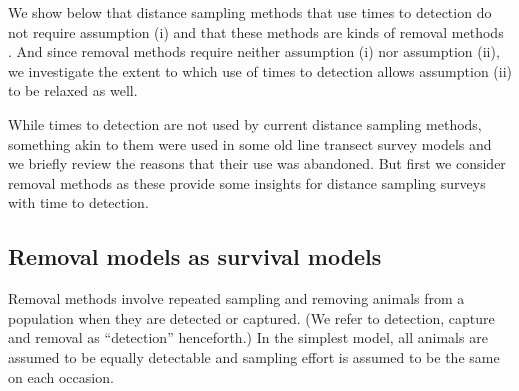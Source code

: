 \documentclass[useAMS,usenatbib,referee]{biom}
\begin{document}
We show below that distance sampling methods that use times to detection do not require assumption (i) and that these methods are kinds of removal methods \citep[see][, Chapters 7 and 5, respectively, for an overview of removal methods]{Seber:82, Borchers+al:02}. And since removal methods require neither assumption (i) nor assumption (ii), we investigate the extent to which use of times to detection allows assumption (ii) to be relaxed as well. 

While times to detection are not used by current distance sampling methods, something akin to them were used in some old line transect survey models and we briefly review the reasons that their use was abandoned. But first we consider removal methods as these provide some insights for distance sampling surveys with time to detection.%

\subsection{Removal models as survival models\label{sec:removal.surv}}

Removal methods involve repeated sampling and removing animals from a population when they are detected or captured. (We refer to detection, capture and removal as ``detection'' henceforth.) In the simplest model, all animals are assumed to be equally detectable and sampling effort is assumed to be the same on each occasion. %
\end{document}
